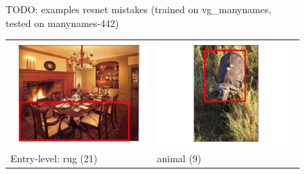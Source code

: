 \begin{figure}
	\caption{TODO: examples resnet mistakes (trained on vg\_manynames, tested on manynames-442)\label{fig:mistakes} }
\end{figure}

\begin{figure}
	\centering
	\footnotesize
	\begin{tabular}{p{3.7cm}p{3.7cm}}
	\includegraphics[scale=.2]{images/556_1063956_seed_ambiguous.png} &
	\includegraphics[scale=.2]{images/2657_1069343_singleton_obj.png} 
	\\
	Entry-level: rug (21) &  animal (9)\\

\end{tabular}
\end{figure}
